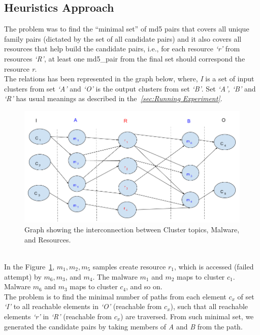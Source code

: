 \subsection{Heuristics Approach}
\label{sub:Heuristics Approach}
The problem was to find the ``minimal set'' of md5 pairs that covers all unique family pairs (dictated by the set of all candidate pairs) and it also covers all resources that help build the candidate pairs, i.e., for each resource \emph{`r'} from resources \emph{`R'}, at least one md5\_pair from the final set should correspond the resource \emph{r}.\\
The relations has been represented in the graph below, where, \emph{I} is a set of input clusters from set \emph{`A'} and \emph{`O'} is the output clusters from set \emph{`B'}. Set \emph{`A', `B'} and \emph{`R'} has usual meanings as described in the\textit{~\autoref{sec:Running Experiment}}.
\begin{figure}[htbp]
  \centering
  \includegraphics[scale=0.45]{figures/dhkheuristics.png}
  \caption[]{Graph showing the interconnection between Cluster topics, Malware, and Resources.}\label{fig:dhkheuristics}
\end{figure}
\\
In the Figure~\ref{fig:dhkheuristics},  $m_1,m_2, m_5$ samples create resource $r_1$, which is accessed (failed attempt) by $m_6, m_3$, and $m_4$.
The malware $m_1$ and $m_2$ maps to cluster $c_1$. Malware $m_6$ and $m_3$ maps to cluster $c_4$, and so on.
\\
The problem is to find the minimal number of paths from each element \emph{$c_x$} of set \emph{`I'} to all reachable elements in \emph{`O'} (reachable from \emph{$c_x$}), such that all reachable elements \emph{`r'} in \emph{`R'} (reachable from \emph{$c_x$}) are traversed. From such minimal set, we generated the candidate pairs by taking members of \emph{A} and \emph{B} from the path.
